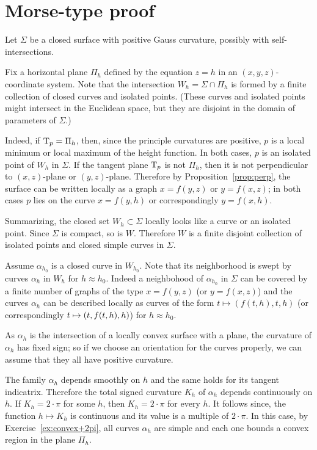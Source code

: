 \section*{Morse-type proof}

Let $\Sigma$ be a closed surface with positive Gauss curvature, possibly with self-intersections. 

Fix a horizontal plane $\Pi_h$ defined by the equation $z=h$ in an $(x,y,z)$-coordinate system.
Note that the intersection $W_h=\Sigma\cap\Pi_h$ is formed by a finite collection of closed curves and isolated points.
(These curves and isolated points might intersect in the Euclidean space, but they are disjoint in the domain of parameters of $\Sigma$.)

Indeed, if $\mathrm{T}_p=\Pi_h$, then, since the principle curvatures are positive, $p$ is a local minimum or local maximum of the height function.
In both cases, $p$ is an isolated point of $W_h$ in $\Sigma$.
If the tangent plane $\mathrm{T}_p$ is not $\Pi_h$, then it is not perpendicular to $(x,z)$-plane or $(y,z)$-plane.
Therefore by Proposition~\ref{prop:perp}, the surface can be written locally as a graph $x=f(y,z)$ or $y=f(x,z)$;
in both cases $p$ lies on the curve $x=f(y,h)$ or correspondingly $y=f(x,h)$.

Summarizing, the closed set $W_h\subset \Sigma$ locally looks like a curve or an isolated point.
Since $\Sigma$ is compact, so is $W$.
Therefore $W$ is a finite disjoint collection of isolated points and closed simple curves in $\Sigma$.

Assume $\alpha_{h_0}$ is a closed curve in $W_{h_0}$.
Note that its neighborhood is swept by curves $\alpha_h$ in $W_{h}$ for $h\approx h_0$.
Indeed a neighbohood of $\alpha_{h_0}$ in $\Sigma$ can be covered by a finite number of graphs of the type $x=f(y,z)$ (or $y=f(x,z)$) and the curves $\alpha_h$ can be described locally as curves of the form $t\mapsto (f(t,h),t,h)$ (or correspondingly $t\z\mapsto(t,f(t,h),h)$) for $h\approx h_0$.

As $\alpha_h$ is the intersection of a locally convex surface with a plane,
the curvature of $\alpha_h$ has fixed sign;
so if we choose an orientation for the curves properly, we can assume that they all have positive curvature.

The family $\alpha_h$ depends smoothly on $h$ and the same holds for its tangent indicatrix.
Therefore the total signed curvature $K_h$ of $\alpha_h$ depends continuously on $h$.
If $K_h=2\cdot\pi$ for some $h$, then $K_h=2\cdot\pi$ for every $h$.
It follows since, the function $h\mapsto K_h$ is continuous and its value is a multiple of $2\cdot\pi$.
In this case, by Exercise~\ref{ex:convex+2pi}, all curves $\alpha_h$ are simple and each one bounds a convex region in the plane $\Pi_h$.

